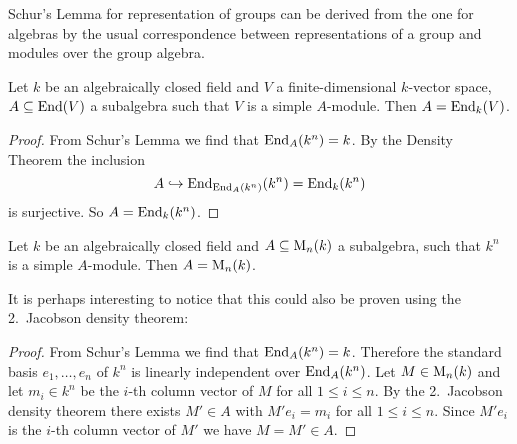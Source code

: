 \begin{rem}
  Schur’s Lemma for representation of groups can be derived from the one for algebras by the usual correspondence between representations of a group and modules over the group algebra.
\end{rem}


\begin{cor}
  Let $k$ be an algebraically closed field and $V$ a finite-dimensional $k$-vector space, $A \subseteq \operatorname{End}(V)$ a subalgebra such that $V$ is a simple $A$-module.
  Then $A = \operatorname{End}_k(V)$.
\end{cor}
\begin{proof}
  From Schur’s Lemma we find that $\operatorname{End}_A(k^n) = k$.
  By the Density Theorem the inclusion
  \[
                    A
    \hookrightarrow \operatorname{End}_{\operatorname{End}_A(k^n)}(k^n)
    =               \operatorname{End}_k(k^n)
  \]
  is surjective.
  So $A = \operatorname{End}_k(k^n)$.
\end{proof}


\begin{cor}
  Let $k$ be an algebraically closed field and $A \subseteq \operatorname{M}_n(k)$ a subalgebra, such that $k^n$ is a simple $A$-module.
  Then $A = \operatorname{M}_n(k)$.
\end{cor}


It is perhaps interesting to notice that this could also be proven using the 2.\ Jacobson density theorem:


\begin{proof}
  From Schur’s Lemma we find that $\operatorname{End}_A(k^n) = k$.
  Therefore the standard basis $e_1, \dotsc, e_n$ of $k^n$ is linearly independent over $\operatorname{End}_A(k^n)$.
  Let $M \in \operatorname{M}_n(k)$ and let $m_i \in k^n$ be the $i$-th column vector of $M$ for all $1 \leq i \leq n$.
  By the 2.\ Jacobson density theorem there exists $M' \in A$ with $M' e_i = m_i$ for all $1 \leq i \leq n$.
  Since $M' e_i$ is the $i$-th column vector of $M'$ we have $M = M' \in A$.
\end{proof}



